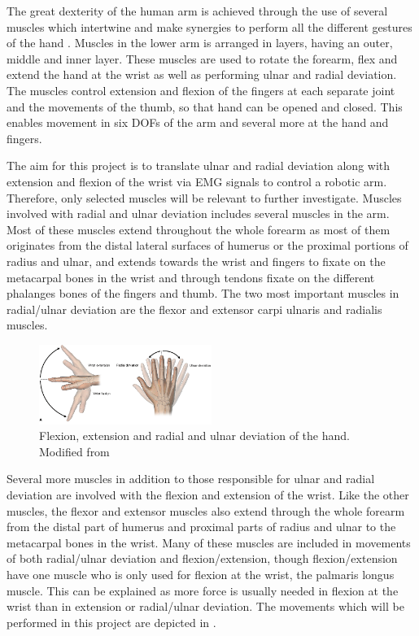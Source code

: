 The great dexterity of the human arm is achieved through the use of several muscles which intertwine and make synergies to perform all the different gestures of the hand \cite{jiang2009, avella2006}. Muscles in the lower arm is arranged in layers, having an outer, middle and inner layer. These muscles are used to rotate the forearm, flex and extend the hand at the wrist as well as performing ulnar and radial deviation. The muscles control extension and flexion of the fingers at each separate joint and the movements of the thumb, so that hand can be opened and closed. This enables movement in six DOFs of the arm and several more at the hand and fingers.

The aim for this project is to translate ulnar and radial deviation along with extension and flexion of the wrist via EMG signals to control a robotic arm. Therefore, only selected muscles will be relevant to further investigate. Muscles involved with radial and ulnar deviation includes several muscles in the arm. Most of these muscles extend throughout the whole forearm as most of them originates from the distal lateral surfaces of humerus or the proximal portions of radius and ulnar, and extends towards the wrist and fingers to fixate on the metacarpal bones in the wrist and through tendons fixate on the different phalanges bones of the fingers and thumb. The two most important muscles in radial/ulnar deviation are the flexor and extensor carpi ulnaris and radialis muscles. 

\begin{figure}[H]
	\includegraphics[width=0.5\textwidth]{figures/anatomy/flexexulradev}  %
	\caption{Flexion, extension and radial and ulnar deviation of the hand. Modified from \cite{zezo2016}}
	\label{fig:wrist_move}  %
\end{figure}

Several more muscles in addition to those responsible for ulnar and radial deviation are involved with the flexion and extension of the wrist. Like the other muscles, the flexor and extensor muscles also extend through the whole forearm from the distal part of humerus and proximal parts of radius and ulnar to the metacarpal bones in the wrist. Many of these muscles are included in movements of both radial/ulnar deviation and flexion/extension, though flexion/extension have one muscle who is only used for flexion at the wrist, the palmaris longus muscle. This can be explained as more force is usually needed in flexion at the wrist than in extension or radial/ulnar deviation. The movements which will be performed in this project are depicted in .

